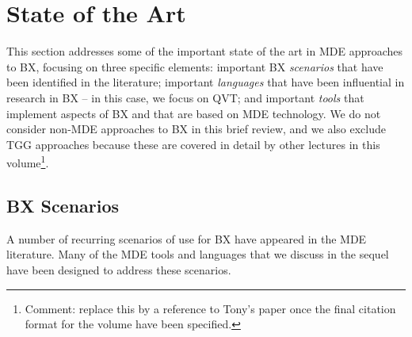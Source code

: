 \section{State of the Art}
\label{section:state-of-the-art}

This section addresses some of the important state of the art in MDE approaches to BX, focusing on three specific elements: important BX \textit{scenarios} that have been identified in the literature; important \textit{languages} that have been influential in research in BX -- in this case, we focus on QVT; and important \textit{tools} that implement aspects of BX and that are based on MDE technology. We do not consider non-MDE approaches to BX in this brief review, and we also exclude TGG approaches because these are covered in detail by other lectures in this volume\footnote{Comment: replace this by a reference to Tony's paper once the final citation format for the volume have been specified.}.

\subsection{BX Scenarios}
A number of recurring scenarios of use for BX have appeared in the MDE literature. Many of the MDE tools and languages that we discuss in the sequel have been designed to address these scenarios.

